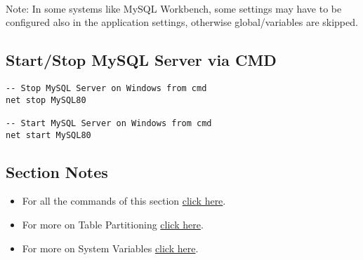 \paragraph{} Note: In some systems like MySQL Workbench, some settings may have to be configured also in the application settings, otherwise global/variables are skipped.
\subsection{Start/Stop MySQL Server via CMD}
\begin{lstlisting}[style=DOS]
-- Stop MySQL Server on Windows from cmd
net stop MySQL80

-- Start MySQL Server on Windows from cmd
net start MySQL80
\end{lstlisting}
\subsection{Section Notes}
\begin{itemize}
	\item For all the commands of this section \href{file:./source-items/sql/6-sql-extras.sql}{click here}.
	\item For more on Table Partitioning \href{https://dev.mysql.com/doc/mysql-partitioning-excerpt/8.0/en/partitioning-types.html}{click here}.
	\item For more on System Variables \href{https://dev.mysql.com/doc/refman/8.0/en/using-system-variables.html}{click here}.
\end{itemize}
